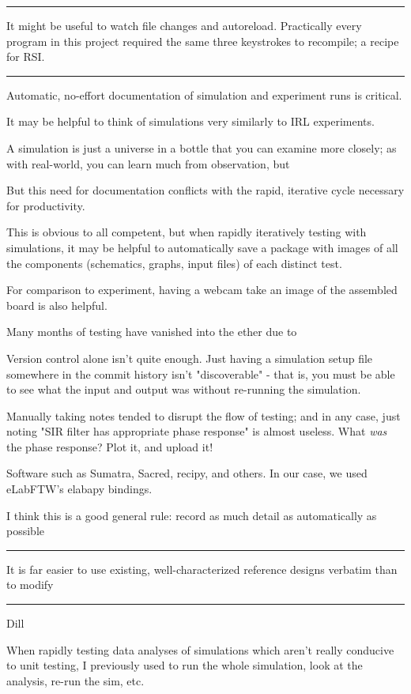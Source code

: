 \documentclass[paper.tex]{subfiles}
\begin{document}
\rule{\linewidth}{0.2pt}

It might be useful to watch file changes and autoreload. Practically every program in this project required the same three keystrokes to recompile; a recipe for RSI.

\rule{\linewidth}{0.2pt}

Automatic, no-effort documentation of simulation and experiment runs is critical.

It may be helpful to think of simulations very similarly to IRL experiments. 

A simulation is just a universe in a bottle that you can examine more closely; as with real-world, you can learn much from observation, but 

But this need for documentation conflicts with the rapid, iterative cycle necessary for productivity.

This is obvious to all competent, but when rapidly iteratively testing with simulations, it may be helpful to automatically save a package with images of all the components (schematics, graphs, input files) of each distinct test. 

For comparison to experiment, having a webcam take an image of the assembled board is also helpful. 

Many months of testing have vanished into the ether due to 

Version control alone isn't quite enough. Just having a simulation setup file somewhere in the commit history isn't "discoverable" - that is, you must be able to see what the input and output was without re-running the simulation. 

Manually taking notes tended to disrupt the flow of testing; and in any case, just noting "SIR filter has appropriate phase response" is almost useless. What {\it was} the phase response? Plot it, and upload it!

Software such as Sumatra, Sacred, recipy, and others. In our case, we used eLabFTW's elabapy bindings.

I think this is a good general rule: record as much detail as automatically as possible

\rule{\linewidth}{0.2pt}

It is far easier to use existing, well-characterized reference designs verbatim than to modify 

\rule{\linewidth}{0.2pt}

Dill

When rapidly testing data analyses of simulations which aren't really conducive to unit testing, I previously used to run the whole simulation, look at the analysis, re-run the sim, etc.
\end{document}
